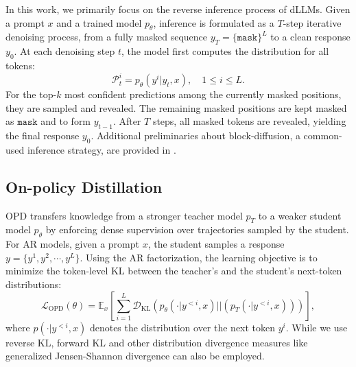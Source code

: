 \documentclass{llmxive}
\providecommand{\mask}{{\texttt{mask}}}
\begin{document}
In this work, we primarily focus on the reverse inference process of dLLMs. Given a prompt $x$ and a trained model $p_\theta$, inference is formulated as a $T$-step iterative denoising process, from a fully masked sequence $y_T = \{\mask\}^L$ to a clean response $y_0$. At each denoising step $t$, the model first computes the distribution for all tokens:
\begin{equation}
    \mathcal{P}_{t}^i = p_\theta(y^i|y_t, x), \quad 1 \leq i \leq L.
\end{equation}
For the top-$k$ most confident predictions among the currently masked positions, they are sampled and revealed. The remaining masked positions are kept masked as $\mask$ and to form $y_{t-1}$. After $T$ steps, all masked tokens are revealed, yielding the final response $y_0$. Additional preliminaries about block-diffusion, a common-used inference strategy, are provided in .


\subsection{On-policy Distillation}


OPD transfers knowledge from a stronger teacher model $p_T$ to a weaker student model $p_\theta$ by enforcing dense supervision over trajectories sampled by the student. For AR models, given a prompt $x$, the student samples a response $y = \{y^1, y^2, \cdots, y^L\}$. Using the AR factorization, the learning objective is to minimize the token-level KL between the teacher's and the student's next-token distributions:
\begin{equation}
    \mathcal{L}_\text{OPD} (\theta) = \mathbb{E}_x \left[ \sum_{i=1}^L \mathcal{D}_\text{KL} \left(p_\theta \left( \cdot | y^{<i}, x  \right) || \left( p_T \left( \cdot | y^{<i}, x \right) \right) \right) \right],
\label{eq4}
\end{equation}
where $p(\cdot | y^{<i}, x)$ denotes the distribution over the next token $y^i$. While we use reverse KL, forward KL and other distribution divergence measures like generalized Jensen-Shannon divergence \citep{agarwal2024policy} can also be employed.
\end{document}
